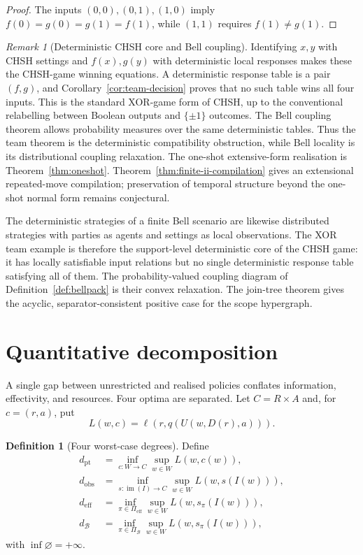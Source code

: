 \documentclass[11pt]{article}
\theoremstyle{plain}
\theoremstyle{definition}
\newtheorem{definition}[theorem]{Definition}
\theoremstyle{remark}
\newtheorem{remark}[theorem]{Remark}
\newcommand{\im}{\operatorname{im}}
\begin{document}
\begin{proof}
The inputs $(0,0),(0,1),(1,0)$ imply
$f(0)=g(0)=g(1)=f(1)$, while $(1,1)$ requires $f(1)\ne g(1)$.
\end{proof}

\begin{remark}[Deterministic CHSH core and Bell coupling]
Identifying $x,y$ with CHSH settings and $f(x),g(y)$ with deterministic local
responses makes these the CHSH-game winning equations. A deterministic response
table is a pair $(f,g)$, and Corollary~\ref{cor:team-decision} proves that no such
table wins all four inputs. This is the standard XOR-game form of CHSH, up to the conventional relabelling
between Boolean outputs and $\{\pm1\}$ outcomes. The Bell coupling theorem allows probability measures over the same deterministic tables. Thus the team theorem is the
deterministic compatibility obstruction, while Bell locality is its
distributional coupling relaxation. The one-shot extensive-form realisation is
Theorem~\ref{thm:oneshot}. Theorem~\ref{thm:finite-ii-compilation} gives
an extensional repeated-move compilation; preservation of temporal structure
beyond the one-shot normal form remains conjectural.
\end{remark}



The deterministic strategies of a finite Bell scenario are likewise distributed
strategies with parties as agents and settings as local observations. The XOR
team example is therefore the support-level deterministic core of the CHSH game:
it has locally satisfiable input relations but no single deterministic response
table satisfying all of them. The probability-valued coupling diagram of Definition~\ref{def:bellpack} is
their convex relaxation. The join-tree theorem gives the acyclic,
separator-consistent positive case for the scope hypergraph.




\section{Quantitative decomposition}\label{sec:quant}

A single gap between unrestricted and realised policies conflates information,
effectivity, and resources. Four optima are separated. Let
$C=R\times A$ and, for $c=(r,a)$, put
\[
L(w,c)=\ell(r,q(U(w,D(r),a))).
\]

\begin{definition}[Four worst-case degrees]\label{def:degree}
Define
\begin{align*}
d_{\mathrm{pt}}
&=\inf_{c:W\to C}\sup_{w\in W}L(w,c(w)),\\
d_{\mathrm{obs}}
&=\inf_{s:\im(I)\to C}\sup_{w\in W}L(w,s(I(w))),\\
d_{\mathrm{eff}}
&=\inf_{\pi\in\Pi_{\mathrm{eff}}}\sup_{w\in W}L(w,s_\pi(I(w))),\\
d_{\mathcal B}
&=\inf_{\pi\in\Pi_{\mathcal B}}\sup_{w\in W}L(w,s_\pi(I(w))),
\end{align*}
with $\inf\varnothing=+\infty$.
\end{definition}
\end{document}
